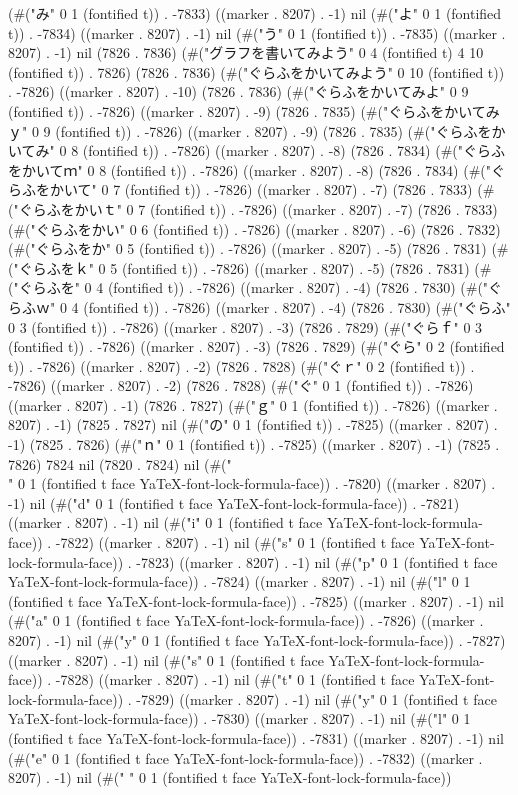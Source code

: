 (#("み" 0 1 (fontified t)) . -7833) ((marker . 8207) . -1) nil (#("よ" 0 1 (fontified t)) . -7834) ((marker . 8207) . -1) nil (#("う" 0 1 (fontified t)) . -7835) ((marker . 8207) . -1) nil (7826 . 7836) (#("グラフを書いてみよう" 0 4 (fontified t) 4 10 (fontified t)) . 7826) (7826 . 7836) (#("ぐらふをかいてみよう" 0 10 (fontified t)) . -7826) ((marker . 8207) . -10) (7826 . 7836) (#("ぐらふをかいてみよ" 0 9 (fontified t)) . -7826) ((marker . 8207) . -9) (7826 . 7835) (#("ぐらふをかいてみｙ" 0 9 (fontified t)) . -7826) ((marker . 8207) . -9) (7826 . 7835) (#("ぐらふをかいてみ" 0 8 (fontified t)) . -7826) ((marker . 8207) . -8) (7826 . 7834) (#("ぐらふをかいてｍ" 0 8 (fontified t)) . -7826) ((marker . 8207) . -8) (7826 . 7834) (#("ぐらふをかいて" 0 7 (fontified t)) . -7826) ((marker . 8207) . -7) (7826 . 7833) (#("ぐらふをかいｔ" 0 7 (fontified t)) . -7826) ((marker . 8207) . -7) (7826 . 7833) (#("ぐらふをかい" 0 6 (fontified t)) . -7826) ((marker . 8207) . -6) (7826 . 7832) (#("ぐらふをか" 0 5 (fontified t)) . -7826) ((marker . 8207) . -5) (7826 . 7831) (#("ぐらふをｋ" 0 5 (fontified t)) . -7826) ((marker . 8207) . -5) (7826 . 7831) (#("ぐらふを" 0 4 (fontified t)) . -7826) ((marker . 8207) . -4) (7826 . 7830) (#("ぐらふｗ" 0 4 (fontified t)) . -7826) ((marker . 8207) . -4) (7826 . 7830) (#("ぐらふ" 0 3 (fontified t)) . -7826) ((marker . 8207) . -3) (7826 . 7829) (#("ぐらｆ" 0 3 (fontified t)) . -7826) ((marker . 8207) . -3) (7826 . 7829) (#("ぐら" 0 2 (fontified t)) . -7826) ((marker . 8207) . -2) (7826 . 7828) (#("ぐｒ" 0 2 (fontified t)) . -7826) ((marker . 8207) . -2) (7826 . 7828) (#("ぐ" 0 1 (fontified t)) . -7826) ((marker . 8207) . -1) (7826 . 7827) (#("ｇ" 0 1 (fontified t)) . -7826) ((marker . 8207) . -1) (7825 . 7827) nil (#("の" 0 1 (fontified t)) . -7825) ((marker . 8207) . -1) (7825 . 7826) (#("ｎ" 0 1 (fontified t)) . -7825) ((marker . 8207) . -1) (7825 . 7826) 7824 nil (7820 . 7824) nil (#("\\" 0 1 (fontified t face YaTeX-font-lock-formula-face)) . -7820) ((marker . 8207) . -1) nil (#("d" 0 1 (fontified t face YaTeX-font-lock-formula-face)) . -7821) ((marker . 8207) . -1) nil (#("i" 0 1 (fontified t face YaTeX-font-lock-formula-face)) . -7822) ((marker . 8207) . -1) nil (#("s" 0 1 (fontified t face YaTeX-font-lock-formula-face)) . -7823) ((marker . 8207) . -1) nil (#("p" 0 1 (fontified t face YaTeX-font-lock-formula-face)) . -7824) ((marker . 8207) . -1) nil (#("l" 0 1 (fontified t face YaTeX-font-lock-formula-face)) . -7825) ((marker . 8207) . -1) nil (#("a" 0 1 (fontified t face YaTeX-font-lock-formula-face)) . -7826) ((marker . 8207) . -1) nil (#("y" 0 1 (fontified t face YaTeX-font-lock-formula-face)) . -7827) ((marker . 8207) . -1) nil (#("s" 0 1 (fontified t face YaTeX-font-lock-formula-face)) . -7828) ((marker . 8207) . -1) nil (#("t" 0 1 (fontified t face YaTeX-font-lock-formula-face)) . -7829) ((marker . 8207) . -1) nil (#("y" 0 1 (fontified t face YaTeX-font-lock-formula-face)) . -7830) ((marker . 8207) . -1) nil (#("l" 0 1 (fontified t face YaTeX-font-lock-formula-face)) . -7831) ((marker . 8207) . -1) nil (#("e" 0 1 (fontified t face YaTeX-font-lock-formula-face)) . -7832) ((marker . 8207) . -1) nil (#(" " 0 1 (fontified t face YaTeX-font-lock-formula-face)) 